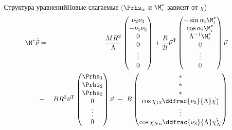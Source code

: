 \begin{frame}{Структура уравнений}{Новые слагаемые ($\Prhs_\alpha$ и $\M^*_i$ зависят от $\chi$)}
\vspace{-15pt}
\begin{eqnarray*}\label{eq:full_system}
\M^*\dot{\vec{\nu}} & = & 
\frac{MR^2}{\Lambda}\left(\begin{matrix}
    \nu_2\nu_3\\
    -\nu_1\nu_3\\
    0\\
    0\\
    \vdots
    \\
    0
\end{matrix}\right)
+
\frac{R}{2l}
\vec{\nu}^\mathrm{T}
\left(\begin{matrix}
    -\sin\alpha_i \M^*_i\\
    \cos\alpha_i \M^*_i\\
    \Lambda^{-1}\M^*_i\\
    0\\
    \vdots
    \\
    0
    \end{matrix}
\right)
\vec{\nu}
\\
 & - & BR^2
\vec{\nu}^\mathrm{T}
\left(\begin{matrix}
    \Prhs_1\\
    \Prhs_2\\
    \Prhs_3\\
    0\\
    \vdots
    \\
    0
\end{matrix}\right)
\vec{\nu}
\ - \
B\left(\begin{matrix}
    *\\
    *\\
    *\\
    \cos\chi_{12}\ddfrac{\nu_3}{\Lambda}\dot{\chi_1^*}\\
    \vdots
    \\
    \cos\chi_{Nn}\ddfrac{\nu_3}{\Lambda}\dot{\chi_N^*}
\end{matrix}\right)
\end{eqnarray*}
\end{frame}

